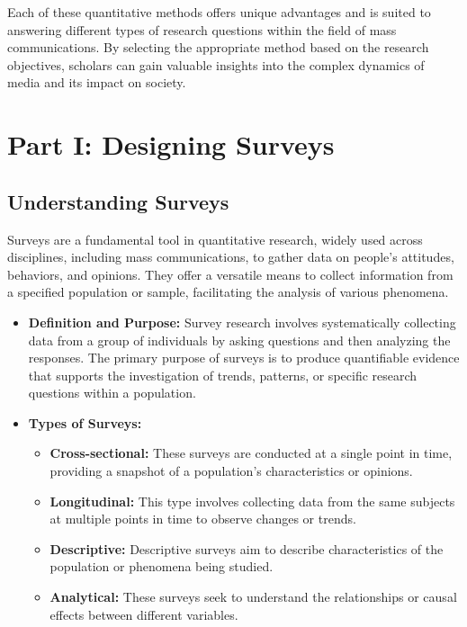 \documentclass[
]{book}
\providecommand{\tightlist}{%
  \setlength{\itemsep}{0pt}\setlength{\parskip}{0pt}}
\begin{document}
Each of these quantitative methods offers unique advantages and is suited to answering different types of research questions within the field of mass communications. By selecting the appropriate method based on the research objectives, scholars can gain valuable insights into the complex dynamics of media and its impact on society.

\hypertarget{part-i-designing-surveys}{%
\section{Part I: Designing Surveys}\label{part-i-designing-surveys}}

\hypertarget{understanding-surveys}{%
\subsection*{Understanding Surveys}\label{understanding-surveys}}

Surveys are a fundamental tool in quantitative research, widely used across disciplines, including mass communications, to gather data on people's attitudes, behaviors, and opinions. They offer a versatile means to collect information from a specified population or sample, facilitating the analysis of various phenomena.

\begin{itemize}
\item
  \textbf{Definition and Purpose:} Survey research involves systematically collecting data from a group of individuals by asking questions and then analyzing the responses. The primary purpose of surveys is to produce quantifiable evidence that supports the investigation of trends, patterns, or specific research questions within a population.
\item
  \textbf{Types of Surveys:}

  \begin{itemize}
  \tightlist
  \item
    \textbf{Cross-sectional:} These surveys are conducted at a single point in time, providing a snapshot of a population's characteristics or opinions.
  \item
    \textbf{Longitudinal:} This type involves collecting data from the same subjects at multiple points in time to observe changes or trends.
  \item
    \textbf{Descriptive:} Descriptive surveys aim to describe characteristics of the population or phenomena being studied.
  \item
    \textbf{Analytical:} These surveys seek to understand the relationships or causal effects between different variables.
  \end{itemize}
\end{itemize}
\end{document}
